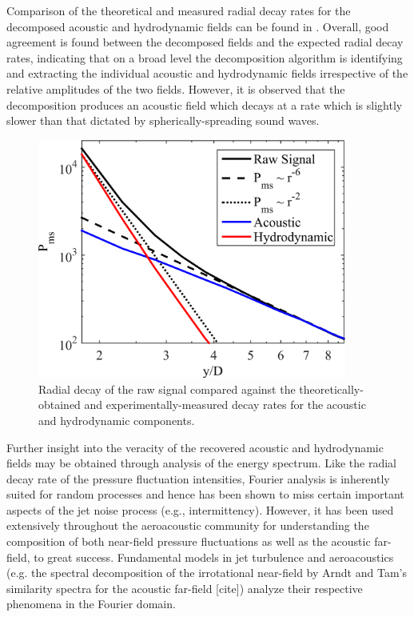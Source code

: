 Comparison of the theoretical and measured radial decay rates for the decomposed acoustic and hydrodynamic fields can be found in .
Overall, good agreement is found between the decomposed fields and the expected radial decay rates, indicating that on a broad level the decomposition algorithm is identifying and extracting the individual acoustic and hydrodynamic fields irrespective of the relative amplitudes of the two fields.
However, it is observed that the decomposition produces an acoustic field which decays at a rate which is slightly slower than that dictated by spherically-spreading sound waves. 
\begin{figure}
	\centering
	\includegraphics[width=4in]{Figures/ch3_validation_Pms.png}
	\caption{Radial decay of the raw signal compared against the theoretically-obtained and experimentally-measured decay rates for the acoustic and hydrodynamic components.}
	\label{fig:ch3_validation_Pms}
\end{figure}

Further insight into the veracity of the recovered acoustic and hydrodynamic fields may be obtained through analysis of the energy spectrum.
Like the radial decay rate of the pressure fluctuation intensities, Fourier analysis is inherently suited for random processes and hence has been shown to miss certain important aspects of the jet noise process (e.g.,  intermittency). 
However, it has been used extensively throughout the aeroacoustic community for understanding the composition of both near-field pressure fluctuations as well as the acoustic far-field, to great success. 
Fundamental models in jet turbulence and aeroacoustics (e.g. the spectral decomposition of the irrotational near-field by Arndt \etal [cite] and Tam’s similarity spectra for the acoustic far-field [cite]) analyze their respective phenomena in the Fourier domain.

